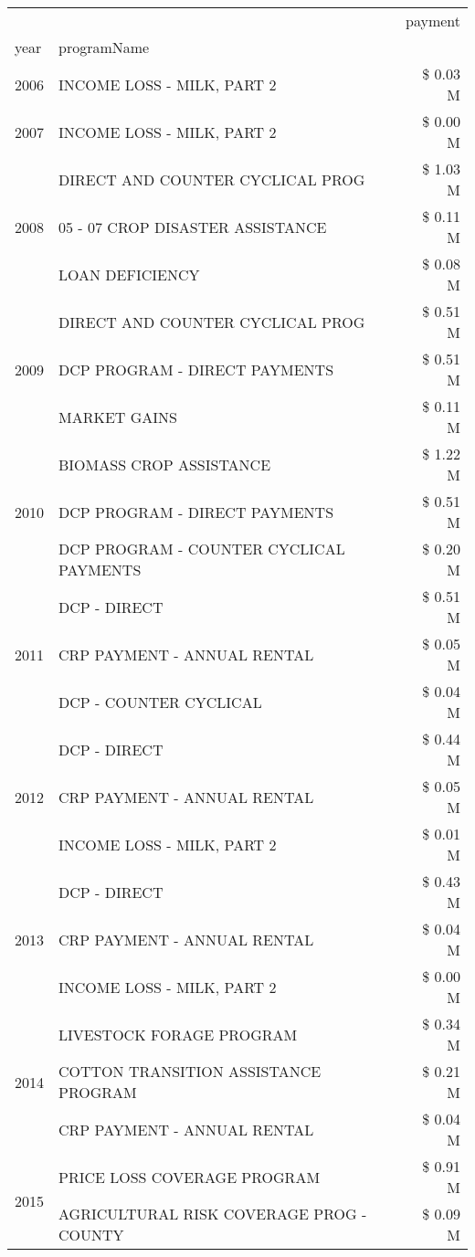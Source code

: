 \begin{tabular}{llr}
\toprule
 &  & payment \\
year & programName &  \\
\midrule
2006 & INCOME LOSS - MILK, PART 2 & \$ 0.03 M \\
\cline{1-3}
2007 & INCOME LOSS - MILK, PART 2 & \$ 0.00 M \\
\cline{1-3}
\multirow[t]{3}{*}{2008} & DIRECT AND COUNTER CYCLICAL PROG & \$ 1.03 M \\
 & 05 - 07 CROP DISASTER ASSISTANCE & \$ 0.11 M \\
 & LOAN DEFICIENCY & \$ 0.08 M \\
\cline{1-3}
\multirow[t]{3}{*}{2009} & DIRECT AND COUNTER CYCLICAL PROG & \$ 0.51 M \\
 & DCP PROGRAM - DIRECT PAYMENTS & \$ 0.51 M \\
 & MARKET GAINS & \$ 0.11 M \\
\cline{1-3}
\multirow[t]{3}{*}{2010} & BIOMASS CROP ASSISTANCE & \$ 1.22 M \\
 & DCP PROGRAM - DIRECT PAYMENTS & \$ 0.51 M \\
 & DCP PROGRAM - COUNTER CYCLICAL PAYMENTS & \$ 0.20 M \\
\cline{1-3}
\multirow[t]{3}{*}{2011} & DCP - DIRECT & \$ 0.51 M \\
 & CRP PAYMENT - ANNUAL RENTAL & \$ 0.05 M \\
 & DCP - COUNTER CYCLICAL & \$ 0.04 M \\
\cline{1-3}
\multirow[t]{3}{*}{2012} & DCP - DIRECT & \$ 0.44 M \\
 & CRP PAYMENT - ANNUAL RENTAL & \$ 0.05 M \\
 & INCOME LOSS - MILK, PART 2 & \$ 0.01 M \\
\cline{1-3}
\multirow[t]{3}{*}{2013} & DCP - DIRECT & \$ 0.43 M \\
 & CRP PAYMENT - ANNUAL RENTAL & \$ 0.04 M \\
 & INCOME LOSS - MILK, PART 2 & \$ 0.00 M \\
\cline{1-3}
\multirow[t]{3}{*}{2014} & LIVESTOCK FORAGE PROGRAM & \$ 0.34 M \\
 & COTTON TRANSITION ASSISTANCE PROGRAM & \$ 0.21 M \\
 & CRP PAYMENT - ANNUAL RENTAL & \$ 0.04 M \\
\cline{1-3}
\multirow[t]{3}{*}{2015} & PRICE LOSS COVERAGE PROGRAM & \$ 0.91 M \\
 & AGRICULTURAL RISK COVERAGE PROG - COUNTY & \$ 0.09 M \\

\end{tabular}
